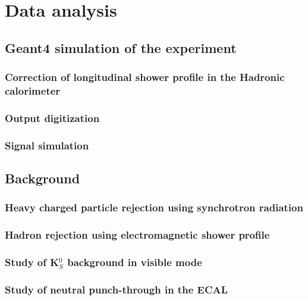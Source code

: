 
\chapter{Data analysis} %

\label{chapter3} %


\section{Geant4 simulation of the experiment}

\subsection{Correction of longitudinal shower profile in the Hadronic calorimeter}

\subsection{Output digitization}

\subsection{Signal simulation}

\section{Background}

\subsection{Heavy charged particle rejection using synchrotron radiation}

\subsection{Hadron rejection using electromagnetic shower profile}

\subsection{Study of K$^0_S$ background in visible mode}

\subsection{Study of neutral punch-through in the ECAL}

